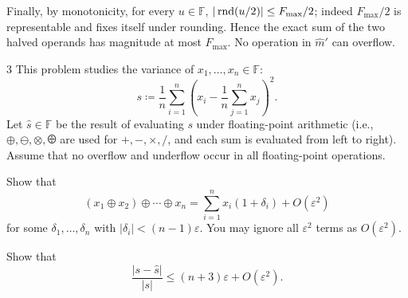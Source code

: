 \documentclass[11pt,oneside]{article}
\begin{document}
\begin{solution}
\begin{problemsubparts}
Finally, by monotonicity, for every $u\in\mathbb F$,
$|\operatorname{rnd}(u/2)|\le F_{\max}/2$; indeed $F_{\max}/2$ is
representable and fixes itself under rounding. Hence the exact
sum of the two halved operands has magnitude at most $F_{\max}$.
No operation in $\widehat m'$ can overflow.
\end{problemsubparts}
\end{solution}

\begin{problem}{3}
This problem studies the variance of $x_1, \ldots, x_n\in\mathbb F$:
\[
 s\coloneqq\frac1n\sum_{i=1}^{n}
 \left(x_i-\frac1n\sum_{j=1}^{n}x_j\right)^2.
\]
Let $\widehat s\in\mathbb F$ be the result of evaluating $s$ under
floating-point arithmetic (i.e., $\oplus, \ominus, \otimes, \odiv$
are used for $+, -, \times, /$, and each sum is evaluated from
left to right). Assume that no overflow and underflow occur in all
floating-point operations.
\begin{problemsubparts}
\item Show that
\[
 (x_1\oplus x_2)\oplus\cdots\oplus x_n
 =\sum_{i=1}^{n}x_i(1+\delta_i)+O(\varepsilon^2)
\]
for some $\delta_1, \ldots, \delta_n$ with
$|\delta_i|<(n-1)\varepsilon$.
You may ignore all $\varepsilon^2$ terms as $O(\varepsilon^2)$.
\item Show that
\[
 \frac{|s-\widehat s|}{|s|}
 \le(n+3)\varepsilon+O(\varepsilon^2).
\]
\end{problemsubparts}
\end{problem}
\end{document}
